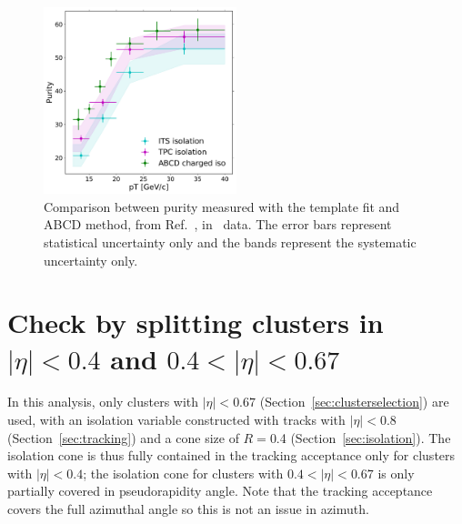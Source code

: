 
\begin{figure}[h]
\center
\includegraphics[width=0.5\textwidth]{Checks_Systematics/ABCDcomparison.pdf}
\caption{Comparison between purity measured with the template fit and ABCD method, from Ref.~\cite{Erwann}, in \pPb~data. The error bars represent statistical uncertainty only and the bands represent the systematic uncertainty only.}
\label{fig:ComparisonToErwanns}
\end{figure}



\section{Check by splitting clusters in $|\eta|<0.4$ and $0.4<|\eta|<0.67$ }

In this analysis, only clusters with $|\eta|<0.67$ (Section~\ref{sec:clusterselection}) are used, with an isolation variable constructed with tracks with $|\eta|<0.8$ (Section~\ref{sec:tracking}) and a cone size of $R=$0.4 (Section~\ref{sec:isolation}). The isolation cone is thus fully contained in the tracking acceptance only for clusters with $|\eta|<0.4$; the isolation cone for clusters with $0.4<|\eta|<0.67$ is only partially covered in pseudorapidity angle. Note that the tracking acceptance covers the full azimuthal angle so this is not an issue in azimuth. 

